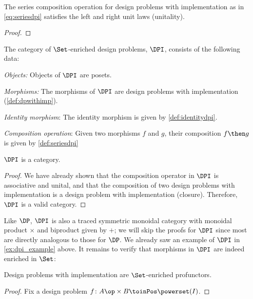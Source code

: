 \begin{lemma}
The series composition operation for design problems with implementation as in \cref{eq:seriesdpi} satisfies the left and right unit laws (unitality).
\end{lemma}

\begin{proof}
\end{proof}


\begin{definition}
The category of $\Set$-enriched design problems, $\DPI$, consists of the following data:
\begin{compactenum}
\item \emph{Objects:}  Objects of $\DPI$ are posets.
\item \emph{Morphisms:} The morphisms of $\DPI$ are design problems with implementation (\cref{def:dpwithimp}).
\item \emph{Identity morphism}: The identity morphism is given by \cref{def:identitydpi}.
\item \emph{Composition operation}: Given two morphisms $f$ and $g$, their composition $f\then g$ is given by \cref{def:seriesdpi}
\end{compactenum}
\end{definition}

\begin{lemma}
$\DPI$ is a category.
\end{lemma}

\begin{proof}
We have already shown that the composition operator in $\DPI$ is associative and unital, and that the composition of two design problems with implementation is a design problem with implementation (closure). Therefore, $\DPI$ is a valid category.
\end{proof}

Like $\DP$, $\DPI$ is also a traced symmetric monoidal category with monoidal product $\times$ and biproduct given by $+$; we will skip the proofs for $\DPI$ since most are directly analogous to those for $\DP$. We already saw an example of $\DPI$ in \cref{ex:dpi_example} above. It remains to verify that morphisms in $\DPI$ are indeed enriched in $\Set$:

\begin{proposition}
Design problems with implementation are $\Set$-enriched profunctors.
\end{proposition}
\begin{proof}
Fix a design problem $f \colon A\op \times B \toinPos \powerset(I)$. 
\end{proof}

